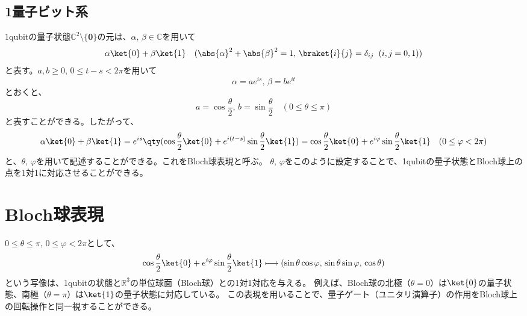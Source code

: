 \documentclass[a4paper,11pt,uplatex]{jsarticle}%
\begin{document}
\subsection{1量子ビット系}
$1$qubitの量子状態$\mathbb{C}^2\setminus\{\bm{0}\}$の元は、$\alpha,\,\beta\in\mathbb{C}$を用いて
\begin{equation}
  \alpha\ket{0}+\beta\ket{1}\quad(\abs{\alpha}^2+\abs{\beta}^2 = 1,\,\braket{i}{j}=\delta_{ij}\;\;(i,j=0,1))
\end{equation}
と表す。$a,b\geq 0,\,0\leq t-s<2\pi$を用いて
\begin{equation}
  \alpha=ae^{is},\,\beta=be^{it}
\end{equation}
とおくと、
\begin{equation}
  a=\cos\frac{\theta}{2},\,b=\sin\frac{\theta}{2}\quad(0\leq\theta\leq \pi)
\end{equation}
と表すことができる。したがって、
\begin{equation}
  \alpha\ket{0}+\beta\ket{1} = e^{is}\qty(\cos\frac{\theta}{2}\ket{0} + e^{i(t-s)}\sin\frac{\theta}{2}\ket{1}) 
  = \cos\frac{\theta}{2}\ket{0} + e^{i\varphi}\sin\frac{\theta}{2}\ket{1}\quad(0\leq \varphi < 2\pi)
\end{equation}
と、$\theta,\,\varphi$を用いて記述することができる。これをBloch球表現と呼ぶ。
$\theta,\,\varphi$をこのように設定することで、1qubitの量子状態とBloch球上の点を1対1に対応させることができる。

\newpage
\section{Bloch球表現}
$0\leq\theta\leq\pi,\,0\leq \varphi<2\pi$として、
\begin{equation}
  \cos\frac{\theta}{2}\ket{0}+e^{i\varphi}\sin\frac{\theta}{2}\ket{1}\longmapsto (\sin\theta\cos\varphi,\,\sin\theta\sin\varphi,\,\cos\theta)
\end{equation}
という写像は、1qubitの状態と$\mathbb{R}^3$の単位球面（Bloch球）との1対1対応を与える。
例えば、Bloch球の北極（$\theta=0$）は$\ket{0}$の量子状態、南極（$\theta=\pi$）は$\ket{1}$の量子状態に対応している。
この表現を用いることで、量子ゲート（ユニタリ演算子）の作用をBloch球上の回転操作と同一視することができる。
\end{document}
